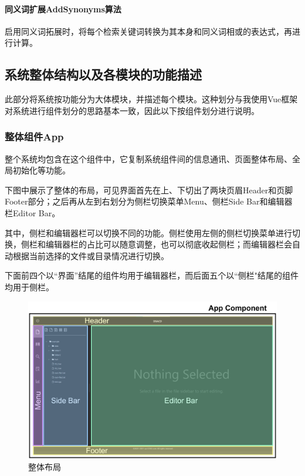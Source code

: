 \documentclass[scheme = chinese]{ctexart}
\begin{document}
\paragraph{同义词扩展AddSynonyms算法} 启用同义词拓展时，将每个检索关键词转换为其本身和同义词相或的表达式，再进行计算。

\subsection{系统整体结构以及各模块的功能描述}
此部分将系统按功能分为大体模块，并描述每个模块。这种划分与我使用Vue框架对系统进行组件划分的思路基本一致，因此以下按组件划分进行说明。

\subsubsection{整体组件App}
整个系统均包含在这个组件中，它复制系统组件间的信息通讯、页面整体布局、全局初始化等功能。

下图中展示了整体的布局，可见界面首先在上、下切出了两块页眉Header和页脚Footer部分；之后再从左到右划分为侧栏切换菜单Menu、侧栏Side Bar和编辑器栏Editor Bar。

其中，侧栏和编辑器栏可以切换不同的功能。侧栏使用左侧的侧栏切换菜单进行切换，侧栏和编辑器栏的占比可以随意调整，也可以彻底收起侧栏；而编辑器栏会自动根据当前选择的文件或目录情况进行切换。

下面前四个以“界面”结尾的组件均用于编辑器栏，而后面五个以“侧栏"结尾的组件均用于侧栏。

\begin{figure}[h]
    \centering
    \includegraphics[width=\textwidth]{images/dsacd-screenshot-layout.drawio.png}
    \caption{整体布局}
\end{figure}
\end{document}
